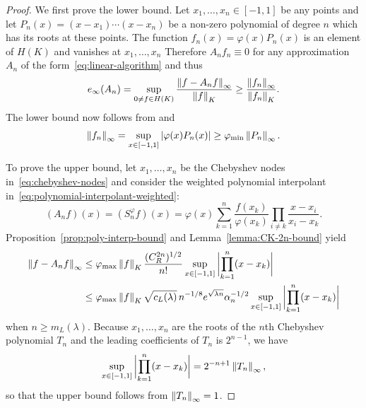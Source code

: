 \documentclass{mcom-l}
\numberwithin{equation}{section}
\numberwithin{theorem}{section} %
\begin{document}
\begin{proof}
  We first prove the lower bound.
  Let $x_{1}, \ldots, x_{n} \in [-1, 1]$ be any points and let $P_n(x) = (x - x_1) \cdots (x - x_n)$ be a non-zero polynomial of degree $n$ which has its roots at these points.
  The function $f_n(x) = \varphi(x) P_n(x)$ is an element of $H(K)$ and vanishes at $x_{1}, \ldots, x_{n}$
  Therefore $A_nf_n \equiv 0$ for any approximation $A_n$ of the form~\eqref{eq:linear-algorithm} and thus
  \begin{equation*}
    e_\infty(A_n) = \sup_{0 \neq f \in H(K)} \frac{\norm[0]{f - A_nf}_\infty}{\norm[0]{f}_K} \geq \frac{\norm[0]{f_n}_\infty}{\norm[0]{f_n}_K}.
  \end{equation*}
  The lower bound now follows from  and
  \begin{equation*}
    \norm[0]{f_n}_\infty = \sup_{x \in [-1, 1]} \abs[0]{\varphi(x) P_n(x)} \geq \varphi_\textup{min} \norm[0]{P_n}_\infty.
  \end{equation*}

  To prove the upper bound, let $x_1, \ldots, x_n$ be the Chebyshev nodes in~\eqref{eq:chebyshev-nodes} and consider the weighted polynomial interpolant in~\eqref{eq:polynomial-interpolant-weighted}:
  \begin{equation*}
    (A_n f)(x) = (S_n^\varphi f)(x) = \varphi(x) \sum_{k=1}^n \frac{f(x_k)}{\varphi(x_k)} \prod_{i \neq k} \frac{x - x_i}{x_i - x_k}.
  \end{equation*}
  Proposition~\ref{prop:poly-interp-bound} and Lemma~\ref{lemma:CK-2n-bound} yield
  \begin{equation*}
    \begin{split}
    \norm[0]{ f - A_n f }_\infty &\leq \varphi_{\max} \norm[0]{f}_K \frac{(C_{R}^{2n})^{1/2}}{n!} \sup_{x \in [-1, 1]} \, \abs[3]{ \prod_{k=1}^n (x - x_k) } \\
    &\leq \varphi_{\max} \norm[0]{f}_K \sqrt{c_L(\lambda)} \, n^{-1/8} e^{\sqrt{\smash[b]{\lambda n}}} \alpha_n^{-1/2} \sup_{x \in [-1, 1]} \, \abs[3]{ \prod_{k=1}^n (x - x_k) }
    \end{split}
  \end{equation*}
  when $n \geq m_L(\lambda)$.
  Because $x_1, \ldots, x_n$ are the roots of the $n$th Chebyshev polynomial $T_n$ and the leading coefficients of $T_n$ is $2^{n-1}$, we have
  \begin{equation} \label{eq:chebyshev-sup-unif-proof}
    \sup_{x \in [-1,1]} \, \abs[3]{ \prod_{k=1}^n (x - x_{k}) } = 2^{-n+1} \norm[0]{T_n}_\infty,
  \end{equation}
  so that the upper bound follows from $\norm[0]{T_n}_\infty = 1$.
\end{proof}
\end{document}
